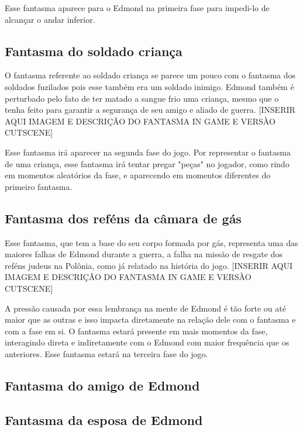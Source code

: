 \documentclass{article}
\begin{document}
	Esse fantasma aparece para o Edmond na primeira fase para impedi-lo de alcançar o andar inferior.

\subsection{Fantasma do soldado criança}
 O fantasma referente ao soldado criança se parece um pouco com o fantasma dos soldados fuzilados pois esse também era um soldado inimigo. Edmond também é perturbado pelo fato de ter matado a sangue frio uma criança, mesmo que o tenha feito para garantir a segurança de seu amigo e aliado de guerra. [INSERIR AQUI IMAGEM E DESCRIÇÃO DO FANTASMA IN GAME E VERSÀO CUTSCENE]
 
 Esse fantasma irá aparecer na segunda fase do jogo. Por representar o fantasma de uma criança, esse fantasma irá tentar pregar "peças" no jogador, como rindo em momentos aleatórios da fase, e  aparecendo em momentos diferentes do primeiro fantasma.
 
\subsection{Fantasma dos reféns da câmara de gás}
Esse fantasma, que tem a base do seu corpo formada por gás, representa uma das maiores falhas de Edmond durante a guerra, a falha na missão de resgate dos reféns judeus na Polônia, como já relatado na história do jogo. [INSERIR AQUI IMAGEM E DESCRIÇÃO DO FANTASMA IN GAME E VERSÀO CUTSCENE]

A pressão causada por essa lembrança na mente de Edmond é tão forte ou até maior que as outras e isso impacta diretamente na relação dele com o fantasma e com a fase em si. O fantasma estará presente em mais momentos da fase, interagindo direta e indiretamente com o Edmond com maior frequência que os anteriores. Esse fantasma estará na terceira fase do jogo.

\subsection{Fantasma do amigo de Edmond}


\subsection{Fantasma da esposa de Edmond}

\subsection{}
\end{document}
